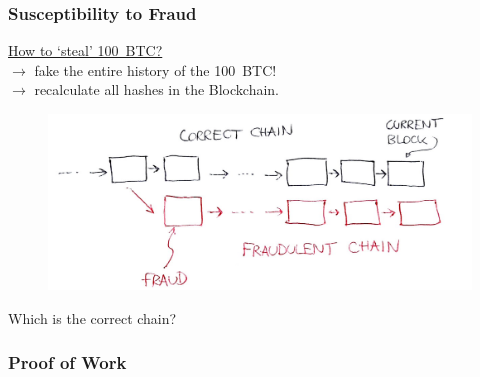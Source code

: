 \documentclass[12pt]{beamer}
\theoremstyle{definition}
\numberwithin{equation}{section}
\begin{document}
\begin{frame}
\frametitle{Susceptibility to Fraud}
\underline{How to `steal' 100~BTC?}\\ \pause $\to$ fake the entire history of the 100~BTC! \\$\to$ recalculate all hashes in the Blockchain.
\begin{figure}
\includegraphics[scale=0.28, trim = {30mm 0mm 0mm 20mm}]{fig3}
\end{figure}
Which is the correct chain?
\end{frame}

\begin{frame}
\frametitle{Proof of Work}
\end{frame}
\end{document}
